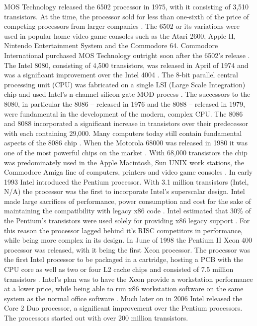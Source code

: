 MOS Technology released the 6502 processor in 1975, with it consisting of 3,510 transistors. At the time, the processor sold for less than one-sixth of the price of competing processors from larger companies \cite{RN29}. The 6502 or its variations were used in popular home video game consoles such as the Atari 2600, Apple II, Nintendo Entertainment System and the Commodore 64. Commodore International purchased MOS Technology outright soon after the 6502’s release \cite{RN29}.
The Intel 8080, consisting of 4,500 transistors, was released in April of 1974 and was a significant improvement over the Intel 4004 \cite{RN8}. The 8-bit parallel central processing unit (CPU) was fabricated on a single LSI (Large Scale Integration) chip and used Intel’s n-channel silicon gate MOD process \cite{RN10}. The successors to the 8080, in particular the 8086 – released in 1976 and the 8088 – released in 1979, were fundamental in the development of the modern, complex CPU. The 8086 and 8088 incorporated a significant increase in transistors over their predecessor with each containing 29,000. Many computers today still contain fundamental aspects of the 8086 chip \cite{RN11}.  
When the Motorola 68000 was released in 1980 it was one of the most powerful chips on the market \cite{RN18}. With 68,000 transistors the chip was predominately used in the Apple Macintosh, Sun UNIX work stations, the Commodore Amiga line of computers, printers and video game consoles \cite{RN18}. 
In early 1993 Intel introduced the Pentium processor. With 3.1 million transistors  (Intel, N/A) the processor was the first to incorporate Intel’s superscalar design. Intel made large sacrifices of performance, power consumption and cost for the sake of maintaining the compatibility with legacy x86 code \cite{RN13}. Intel estimated that 30\% of the Pentium’s transistors were used solely for providing x86 legacy support \cite{RN7}. For this reason the processor lagged behind it’s RISC competitors in performance, while being more complex in its design.
In June of 1998 the Pentium II Xeon 400 processor was released, with it being the first Xeon processor. The processor was the first Intel processor to be packaged in a cartridge, hosting a PCB with the CPU core as well as two or four L2 cache chips \cite{RN12} and consisted of 7.5 million transistors \cite{RN19}. Intel’s plan was to have the Xeon provide a workstation performance at a lower price, while being able to run x86 workstation software on the same system as the normal office software \cite{RN12}.
Much later on in 2006 Intel released the Core 2 Duo processor, a significant improvement over the Pentium processors. The processors started out with over 200 million transistors. 
